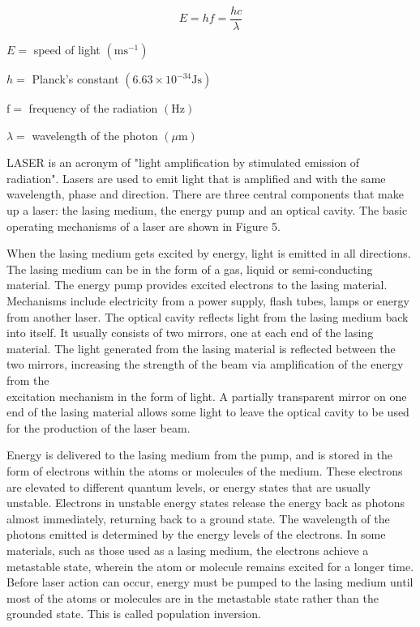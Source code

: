 \documentclass[10pt]{article}
\begin{document}
\begin{equation*}
E=h f=\frac{h c}{\lambda} \tag{1}
\end{equation*}


$E=$ speed of light $\left(\mathrm{m} \mathrm{s}^{-1}\right)$

$h=$ Planck's constant $\left(6.63 \times 10^{-34} \mathrm{Js}\right)$

$\mathrm{f}=$ frequency of the radiation $(\mathrm{Hz})$

$\lambda=$ wavelength of the photon $(\mu \mathrm{m})$

LASER is an acronym of "light amplification by stimulated emission of radiation". Lasers are used to emit light that is amplified and with the same wavelength, phase and direction. There are three central components that make up a laser: the lasing medium, the energy pump and an optical cavity. The basic operating mechanisms of a laser are shown in Figure 5.

When the lasing medium gets excited by energy, light is emitted in all directions. The lasing medium can be in the form of a gas, liquid or semi-conducting material. The energy pump provides excited electrons to the lasing material. Mechanisms include electricity from a power supply, flash tubes, lamps or energy from another laser. The optical cavity reflects light from the lasing medium back into itself. It usually consists of two mirrors, one at each end of the lasing material. The light generated from the lasing material is reflected between the two mirrors, increasing the strength of the beam via amplification of the energy from the\\
excitation mechanism in the form of light. A partially transparent mirror on one end of the lasing material allows some light to leave the optical cavity to be used for the production of the laser beam.

Energy is delivered to the lasing medium from the pump, and is stored in the form of electrons within the atoms or molecules of the medium. These electrons are elevated to different quantum levels, or energy states that are usually unstable. Electrons in unstable energy states release the energy back as photons almost immediately, returning back to a ground state. The wavelength of the photons emitted is determined by the energy levels of the electrons. In some materials, such as those used as a lasing medium, the electrons achieve a metastable state, wherein the atom or molecule remains excited for a longer time. Before laser action can occur, energy must be pumped to the lasing medium until most of the atoms or molecules are in the metastable state rather than the grounded state. This is called population inversion.
\end{document}
